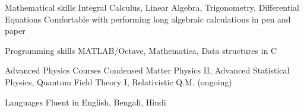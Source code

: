 

\begin{cvskills}


  
  \cvskill
	{Mathematical skills} %
	{Integral Calculus, Linear Algebra, Trigonometry, Differential Equations}
  \cvskill
	{}
	{Comfortable with performing long algebraic calculations in pen and paper} %

  \cvskill
    {Programming skills} %
    {MATLAB/Octave, Mathematica, Data structures in C} %

  \cvskill
{Advanced Physics Courses} %
{Condensed Matter Physics II, Advanced Statistical Physics, Quantum Field Theory I, Relativistic Q.M. (ongoing)} %

  \cvskill
    {Languages} %
    {Fluent in English, Bengali, Hindi} %

\end{cvskills}
